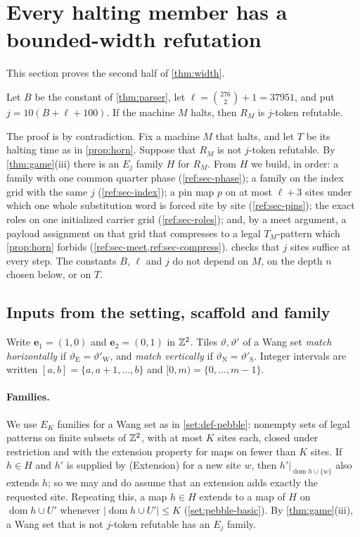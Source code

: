 \section{Every halting member has a bounded-width refutation}\label{sec:refutation}

This section proves the second half of \cref{thm:width}.

\begin{theorem}\label{thm:halting}
Let $B$ be the constant of \cref{thm:parser}, let $\ell=\binom{276}{2}+1=37951$, and put $j=10(B+\ell+100)$. If the machine $M$ halts, then $R_M$ is $j$-token refutable.
\end{theorem}

The proof is by contradiction. Fix a machine $M$ that halts, and let $T$ be its halting time as in \cref{prop:horn}. Suppose that $R_M$ is not $j$-token refutable. By \cref{thm:game}(iii) there is an $E_j$ family $H$ for $R_M$. From $H$ we build, in order: a family with one common quarter phase (\cref{ref:sec-phase}); a family on the index grid with the same $j$ (\cref{ref:sec-index}); a pin map $p$ on at most $\ell+3$ sites under which one whole substitution word is forced site by site (\cref{ref:sec-pins}); the exact roles on one initialized carrier grid (\cref{ref:sec-roles}); and, by a meet argument, a payload assignment on that grid that compresses to a legal $T_M$-pattern which \cref{prop:horn} forbids (\cref{ref:sec-meet,ref:sec-compress}).  checks that $j$ sites suffice at every step. The constants $B$, $\ell$ and $j$ do not depend on $M$, on the depth $n$ chosen below, or on $T$.

\subsection{Inputs from the setting, scaffold and family}\label{ref:sec-inputs}

Write $\mathbf e_1=(1,0)$ and $\mathbf e_2=(0,1)$ in $\mathbb{Z}^2$. Tiles $\vartheta,\vartheta'$ of a Wang set \emph{match horizontally} if $\vartheta_{\mathrm E}=\vartheta'_{\mathrm W}$, and \emph{match vertically} if $\vartheta_{\mathrm N}=\vartheta'_{\mathrm S}$. Integer intervals are written $[a,b]=\{a,a+1,\dots,b\}$ and $[0,m)=\{0,\dots,m-1\}$.

\paragraph{Families.} We use $E_K$ families for a Wang set as in \cref{set:def-pebble}: nonempty sets of legal patterns on finite subsets of $\mathbb{Z}^2$, with at most $K$ sites each, closed under restriction and with the extension property for maps on fewer than $K$ sites. If $h\in H$ and $h'$ is supplied by (Extension) for a new site $w$, then $h'|_{\operatorname{dom}h\cup\{w\}}$ also extends $h$; so we may and do assume that an extension adds exactly the requested site. Repeating this, a map $h\in H$ extends to a map of $H$ on $\operatorname{dom}h\cup U'$ whenever $|\operatorname{dom}h\cup U'|\le K$ (\cref{set:pebble-basic}). By \cref{thm:game}(iii), a Wang set that is not $j$-token refutable has an $E_j$ family.


